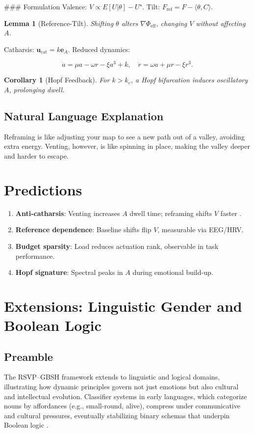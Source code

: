 \documentclass[11pt]{article}
\theoremstyle{plain}
\newtheorem{lemma}{Lemma}
\newtheorem{corollary}{Corollary}
\begin{document}
### Formulation
Valence: \(V \propto E[U|\theta] - U^\star\). Tilt: \(F_{\text{ref}} = F - \langle \theta, C \rangle\).

\begin{lemma}[Reference-Tilt]
Shifting \(\theta\) alters \(\nabla \Phi_{\text{eff}}\), changing \(V\) without affecting \(A\).
\end{lemma}

Catharsis: \(\mathbf{u}_{\text{cat}} = k \mathbf{e}_A\). Reduced dynamics:

\[
\dot{a} = \mu a - \omega r - \xi a^3 + k, \quad \dot{r} = \omega a + \mu r - \xi r^3.
\]

\begin{corollary}[Hopf Feedback]
For \(k > k_c\), a Hopf bifurcation induces oscillatory \(A\), prolonging dwell.
\end{corollary}

\subsection{Natural Language Explanation}
Reframing is like adjusting your map to see a new path out of a valley, avoiding extra energy. Venting, however, is like spinning in place, making the valley deeper and harder to escape.

\section{Predictions}

\begin{enumerate}
\item \textbf{Anti-catharsis}: Venting increases \(A\) dwell time; reframing shifts \(V\) faster \citep{Brown1988}.
\item \textbf{Reference dependence}: Baseline shifts flip \(V\), measurable via EEG/HRV.
\item \textbf{Budget sparsity}: Load reduces actuation rank, observable in task performance.
\item \textbf{Hopf signature}: Spectral peaks in \(A\) during emotional build-up.
\end{enumerate}

\section{Extensions: Linguistic Gender and Boolean Logic}

\subsection{Preamble}
The RSVP–GBSH framework extends to linguistic and logical domains, illustrating how dynamic principles govern not just emotions but also cultural and intellectual evolution. Classifier systems in early languages, which categorize nouns by affordances (e.g., small-round, alive), compress under communicative and cultural pressures, eventually stabilizing binary schemas that underpin Boolean logic \citep{Aikhenvald2000, Boole1854}.
\end{document}
